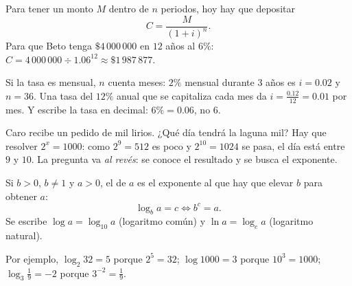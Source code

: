 \documentclass[11pt,a4paper]{article}
\begin{document}
\begin{figura}
\end{figura}

\begin{propiedad}
Para tener un monto $M$ dentro de $n$ periodos, hoy hay que depositar
\[ C=\frac{M}{(1+i)^{n}} . \]
Para que Beto tenga $\$4\,000\,000$ en $12$ años al $6\%$: $C=4\,000\,000\div1.06^{12}\approx\$1\,987\,877$.
\end{propiedad}

\begin{ojo}
Si la tasa es mensual, $n$ cuenta meses: $2\%$ mensual durante $3$ años es $i=0.02$ y $n=36$. Una tasa del
$12\%$ anual que se capitaliza cada mes da $i=\tfrac{0.12}{12}=0.01$ por mes. Y escribe la tasa en decimal:
$6\%=0.06$, no $6$.
\end{ojo}


Caro recibe un pedido de mil lirios. ¿Qué día tendrá la laguna mil? Hay que resolver $2^{x}=1000$: como
$2^{9}=512$ es poco y $2^{10}=1024$ se pasa, el día está entre $9$ y $10$. La pregunta va \emph{al revés}: se
conoce el resultado y se busca el exponente.

\begin{definicion}[Logaritmo]
Si $b>0$, $b\neq1$ y $a>0$, el  de $a$ es el exponente al que hay que elevar $b$ para obtener $a$:
\[ \log_b a=c\iff b^{c}=a . \]
Se escribe $\log a=\log_{10}a$ (logaritmo común) y $\ln a=\log_e a$ (logaritmo natural).
\end{definicion}
Por ejemplo, $\log_2 32=5$ porque $2^{5}=32$; $\log 1000=3$ porque $10^{3}=1000$; $\log_3\tfrac19=-2$ porque $3^{-2}=\tfrac19$.
\end{document}
